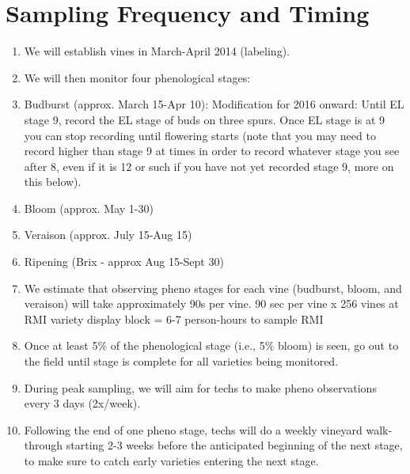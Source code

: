 \documentclass[11pt,letter]{article}
\begin{document}
\section{Sampling Frequency and Timing}

\begin{enumerate}
\item We will establish vines in March-April 2014 (labeling). 
\item We will then monitor four phenological stages: 
	\item Budburst (approx. March 15-Apr 10): Modification for 2016 onward: Until EL stage 9, record the EL stage of buds on three spurs. Once EL stage is at 9 you can stop recording until flowering starts (note that you may need to record higher than stage 9 at times in order to record whatever stage you see after 8, even if it is 12 or such if you have not yet recorded stage 9, more on this below).
	\item Bloom (approx. May 1-30)
	\item Veraison (approx. July 15-Aug 15)
	\item Ripening (Brix - approx Aug 15-Sept 30)
\item We estimate that observing pheno stages for each vine (budburst, bloom, and veraison) will take approximately 90s per vine. 
90 sec per vine x 256 vines at RMI variety display block = 6-7 person-hours to sample RMI
\item Once at least 5\% of the phenological stage (i.e., 5\% bloom) is seen, go out to the field until stage is complete for all varieties being monitored. 
\item During peak sampling, we will aim for techs to make pheno observations every 3 days (2x/week). 
\item Following the end of one pheno stage, techs will do a weekly vineyard walk-through starting 2-3 weeks before the anticipated beginning of the next stage, to make sure to catch early varieties entering the next stage.
\end{enumerate}
\end{document}
